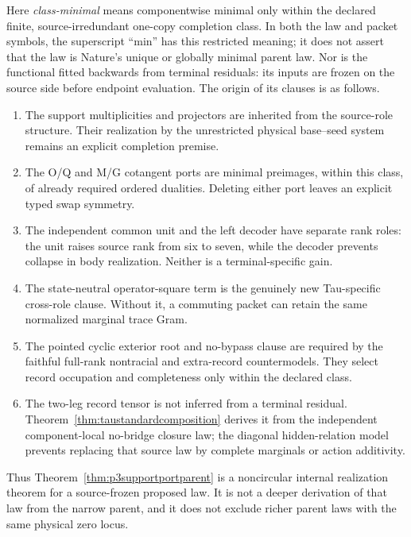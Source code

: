 Here \emph{class-minimal} means componentwise minimal only within the
declared finite, source-irredundant one-copy completion class.  In both the
law and packet symbols, the superscript ``min'' has this restricted meaning;
it does not assert
that the law is Nature's unique or globally minimal parent law.  Nor is the
functional fitted backwards from terminal residuals: its inputs are frozen
on the source side before endpoint evaluation.  The origin of its clauses is
as follows.
\begin{enumerate}[label=(\roman*),nosep]
\item The support multiplicities and projectors are inherited from the
  source-role structure.  Their realization by the unrestricted physical
  base--seed system remains an explicit completion premise.
\item The O/Q and M/G cotangent ports are minimal preimages, within this
  class, of already required ordered dualities.  Deleting either port leaves
  an explicit typed swap symmetry.
\item The independent common unit and the left decoder have separate rank
  roles: the unit raises source rank from six to seven, while the decoder
  prevents collapse in body realization.  Neither is a terminal-specific
  gain.
\item The state-neutral operator-square term is the genuinely new
  Tau-specific cross-role clause.  Without it, a commuting packet can retain
  the same normalized marginal trace Gram.
\item The pointed cyclic exterior root and no-bypass clause are required by
  the faithful full-rank nontracial and extra-record countermodels.  They
  select record occupation and completeness only within the declared class.
\item The two-leg record tensor is not inferred from a terminal residual.
  Theorem~\ref{thm:taustandardcomposition} derives it from the independent
  component-local no-bridge closure law; the diagonal hidden-relation model
  prevents replacing that source law by complete marginals or action
  additivity.
\end{enumerate}
Thus Theorem~\ref{thm:p3supportportparent} is a noncircular internal
realization theorem for a source-frozen proposed law.  It is not a deeper
derivation of that law from the narrow parent, and it does not exclude richer
parent laws with the same physical zero locus.

